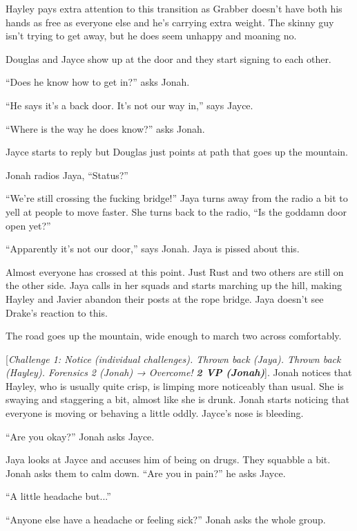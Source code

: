Hayley pays extra attention to this transition as Grabber doesn't have both his hands as free as everyone else and he's carrying extra weight.  The skinny guy isn't trying to get away, but he does seem unhappy and moaning no.

Douglas and Jayce show up at the door and they start signing to each other.  

``Does he know how to get in?'' asks Jonah.

``He says it's a back door.  It's not our way in,'' says Jayce.

``Where is the way he does know?'' asks Jonah.

Jayce starts to reply but Douglas just points at path that goes up the mountain.

Jonah radios Jaya, ``Status?''

``We're still crossing the fucking bridge!''  Jaya turns away from the radio a bit to yell at people to move faster.  She turns back to the radio, ``Is the goddamn door open yet?''

``Apparently it's not our door,'' says Jonah.  Jaya is pissed about this.

Almost everyone has crossed at this point.  Just Rust and two others are still on the other side.  Jaya calls in her squads and starts marching up the hill, making Hayley and Javier abandon their posts at the rope bridge.  Jaya doesn't see Drake's reaction to this.





The road goes up the mountain, wide enough to march two across comfortably. 

{[}\textit{Challenge 1: Notice (individual challenges).  Thrown back (Jaya).  Thrown back (Hayley).  Forensics 2 (Jonah) → Overcome! }\textit{\textbf{2 VP (Jonah)}}{]}.  Jonah notices that Hayley, who is usually quite crisp, is limping more noticeably than usual.  She is swaying and staggering a bit, almost like she is drunk.  Jonah starts noticing that everyone is moving or behaving a little oddly.  Jayce's nose is bleeding.

``Are you okay?'' Jonah asks Jayce.

Jaya looks at Jayce and accuses him of being on drugs.  They squabble a bit.  Jonah asks them to calm down.  ``Are you in pain?'' he asks Jayce.

``A little headache but...''

``Anyone else have a headache or feeling sick?'' Jonah asks the whole group.

